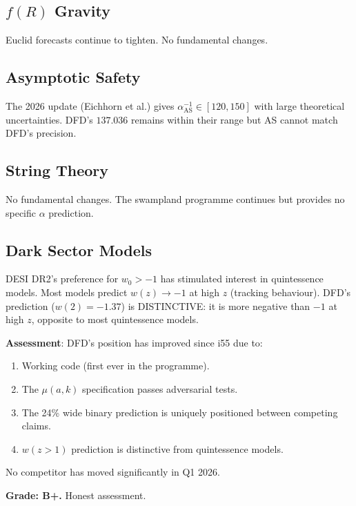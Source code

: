 \documentclass[11pt,a4paper]{article}
\begin{document}
\subsection{$f(R)$ Gravity}

Euclid forecasts continue to tighten. No fundamental changes.

\subsection{Asymptotic Safety}

The 2026 update (Eichhorn et al.) gives $\alpha^{-1}_{\mathrm{AS}} \in [120, 150]$ with large theoretical uncertainties. DFD's $137.036$ remains within their range but AS cannot match DFD's precision.

\subsection{String Theory}

No fundamental changes. The swampland programme continues but provides no specific $\alpha$ prediction.

\subsection{Dark Sector Models}

DESI DR2's preference for $w_0 > -1$ has stimulated interest in quintessence models. Most models predict $w(z) \to -1$ at high $z$ (tracking behaviour). DFD's prediction ($w(2) = -1.37$) is DISTINCTIVE: it is more negative than $-1$ at high $z$, opposite to most quintessence models.

\begin{tcolorbox}[colback=blue!5!white, colframe=blue!60!black, title={Agent 17: Competition Update --- DFD POSITION STRENGTHENED}]
\textbf{Assessment}: DFD's position has improved since i55 due to:
\begin{enumerate}
\item Working code (first ever in the programme).
\item The $\mu(a,k)$ specification passes adversarial tests.
\item The 24\% wide binary prediction is uniquely positioned between competing claims.
\item $w(z > 1)$ prediction is distinctive from quintessence models.
\end{enumerate}

No competitor has moved significantly in Q1 2026.

\textbf{Grade: B+.} Honest assessment.
\end{tcolorbox}
\end{document}
